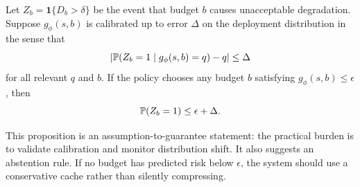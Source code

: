 \begin{proposition}
Let $Z_b=\mathbf{1}\{D_b>\delta\}$ be the event that budget $b$ causes unacceptable degradation. Suppose $g_{\phi}(s,b)$ is calibrated up to error $\Delta$ on the deployment distribution in the sense that
\[
\left|\mathbb{P}(Z_b=1 \mid g_{\phi}(s,b)=q)-q\right| \le \Delta
\]
for all relevant $q$ and $b$. If the policy chooses any budget $b$ satisfying $g_{\phi}(s,b)\le \epsilon$, then
\[
\mathbb{P}(Z_b=1) \le \epsilon+\Delta.
\]
\end{proposition}

This proposition is an assumption-to-guarantee statement: the practical burden is to validate calibration and monitor distribution shift. It also suggests an abstention rule. If no budget has predicted risk below $\epsilon$, the system should use a conservative cache rather than silently compressing.
